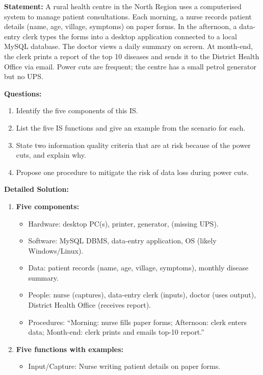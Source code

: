 \documentclass[11pt]{article}
\newcounter{popsec}
\newcounter{popsub}
\newcommand{\courssub}[1]{%
  \stepcounter{popsub}%
  \par\vspace{9pt}\noindent{\popxbold\fontsize{11.5}{13}\selectfont\color{popink}{\color{poporange}\thepopsec.\thepopsub}\hspace{6pt}#1}\par\nopagebreak\vspace{4pt}
}
\begin{document}
\courssub{Worked Example}

\begin{exoresolu}
\textbf{Statement:} A rural health centre in the North Region uses a computerised system to manage patient consultations. Each morning, a nurse records patient details (name, age, village, symptoms) on paper forms. In the afternoon, a data-entry clerk types the forms into a desktop application connected to a local MySQL database. The doctor views a daily summary on screen. At month-end, the clerk prints a report of the top 10 diseases and sends it to the District Health Office via email. Power cuts are frequent; the centre has a small petrol generator but no UPS.

\textbf{Questions:}
\begin{enumerate}
    \item Identify the five components of this IS.
    \item List the five IS functions and give an example from the scenario for each.
    \item State two information quality criteria that are at risk because of the power cuts, and explain why.
    \item Propose one procedure to mitigate the risk of data loss during power cuts.
\end{enumerate}
\tcblower
\textbf{Detailed Solution:}
\begin{enumerate}
    \item \textbf{Five components:}
        \begin{itemize}
            \item Hardware: desktop PC(s), printer, generator, (missing UPS).
            \item Software: MySQL DBMS, data-entry application, OS (likely Windows/Linux).
            \item Data: patient records (name, age, village, symptoms), monthly disease summary.
            \item People: nurse (captures), data-entry clerk (inputs), doctor (uses output), District Health Office (receives report).
            \item Procedures: ``Morning: nurse fills paper forms; Afternoon: clerk enters data; Month-end: clerk prints and emails top-10 report.''
        \end{itemize}
    \item \textbf{Five functions with examples:}
        \begin{itemize}
            \item Input/Capture: Nurse writing patient details on paper forms.

\end{itemize}
\end{enumerate}
\end{exoresolu}
\end{document}
